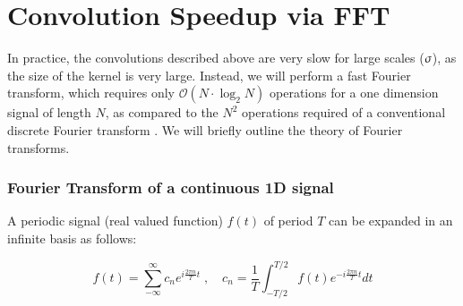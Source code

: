 %
%   	
%   	


\section{Convolution Speedup via FFT}

In practice, the convolutions described above  are very slow for large scales ($\large \sigma$), as the size of the kernel is very large. Instead, we will perform a fast Fourier transform, which requires only $\mathscr{O}\left(N\cdot \log_2N\right)$ operations for a one dimension signal of length $N$, as compared to the $N^2$ operations required of a conventional discrete Fourier transform \cite{DIPGW}. We will briefly outline the theory of Fourier transforms.

\subsubsection{Fourier Transform of a continuous 1D signal}


A periodic signal (real valued function) $f(t)$ of period $T$ can  be expanded in an infinite basis as follows:

\begin{equation}
f(t) = \sum_{-\infty}^{\infty} c_n e^{i\frac{2\pi n}{T}t} \;,\quad
	c_n = \frac{1}{T}\int_{-T/2}^{T/2} f(t) e^{-i\frac{2\pi n}{T}t} dt
	\end{equation}

